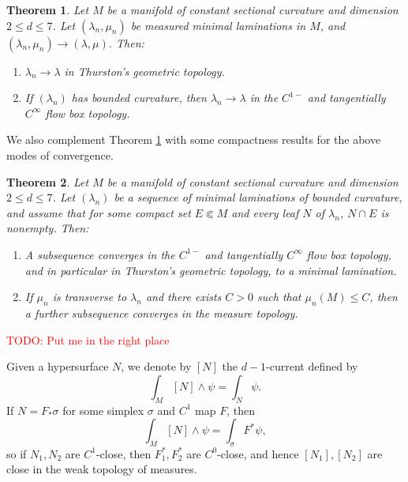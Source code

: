 \documentclass[reqno,11pt]{amsart}
\newtheorem{theorem}{Theorem}[section]
\theoremstyle{definition}
\numberwithin{equation}{section}
\newcommand\todo[1]{\textcolor{red}{TODO: #1}}
\begin{document}
\begin{theorem}\label{implication theorem}
Let $M$ be a manifold of constant sectional curvature and dimension $2 \leq d \leq 7$.
Let $(\lambda_n, \mu_n)$ be measured minimal laminations in $M$, and $(\lambda_n, \mu_n) \to (\lambda, \mu)$.
Then:
\begin{enumerate}
	\item $\lambda_n \to \lambda$ in Thurston's geometric topology.
	\item If $(\lambda_n)$ has bounded curvature, then $\lambda_n \to \lambda$ in the $C^{1-}$ and tangentially $C^\infty$ flow box topology.
\end{enumerate}
\end{theorem}

We also complement Theorem \ref{implication theorem} with some compactness results for the above modes of convergence.

\begin{theorem}\label{compactness theorem}
Let $M$ be a manifold of constant sectional curvature and dimension $2 \leq d \leq 7$.
Let $(\lambda_n)$ be a sequence of minimal laminations of bounded curvature, and assume that for some compact set $E \Subset M$ and every leaf $N$ of $\lambda_n$, $N \cap E$ is nonempty. Then:
\begin{enumerate}
\item A subsequence converges in the $C^{1-}$ and tangentially $C^\infty$ flow box topology, and in particular in Thurston's geometric topology, to a minimal lamination.
\item If $\mu_n$ is transverse to $\lambda_n$ and there exists $C > 0$ such that $\mu_n(M) \leq C$, then a further subsequence converges in the measure topology.
\end{enumerate}
\end{theorem}

\todo{Put me in the right place}

Given a hypersurface $N$, we denote by $[N]$ the $d-1$-current defined by 
$$\int_M [N] \wedge \psi = \int_N \psi.$$
If $N = F_* \sigma$ for some simplex $\sigma$ and $C^1$ map $F$, then 
$$\int_M [N] \wedge \psi = \int_\sigma F^* \psi,$$
so if $N_1, N_2$ are $C^1$-close, then $F_1^*, F_2^*$ are $C^0$-close, and hence $[N_1], [N_2]$ are close in the weak topology of measures.
\end{document}
